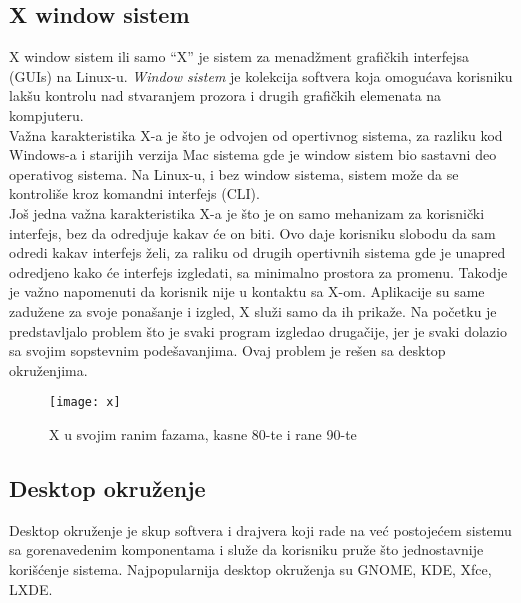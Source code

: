 \subsection{X window sistem}
X window sistem ili samo ``X'' je sistem za menadžment grafičkih interfejsa (GUIs) na Linux-u. \textit{Window sistem} je kolekcija softvera koja omogućava korisniku lakšu kontrolu nad stvaranjem prozora i drugih grafičkih elemenata na kompjuteru.\\
Važna karakteristika X-a je što je odvojen od opertivnog sistema, za razliku kod Windows-a i starijih verzija Mac sistema gde je window sistem bio sastavni deo operativog sistema. Na Linux-u, i bez window sistema, sistem može da se kontroliše kroz komandni interfejs (CLI).\\
Još jedna važna karakteristika X-a je što je on samo mehanizam za korisnički interfejs, bez da odredjuje kakav će on biti. Ovo daje korisniku slobodu da sam odredi kakav interfejs želi, za raliku od drugih opertivnih sistema gde je unapred odredjeno kako će interfejs izgledati, sa minimalno prostora za promenu. Takodje je važno napomenuti da korisnik nije u kontaktu sa X-om. Aplikacije su same zadužene za svoje ponašanje i izgled, X služi samo da ih prikaže. Na početku je predstavljalo problem što je svaki program izgledao drugačije, jer je svaki dolazio sa svojim sopstevnim podešavanjima. Ovaj problem je rešen sa desktop okruženjima.\\
\begin{figure}[H]
	\centering
	\texttt{[image: x]}
	\caption{X u svojim ranim fazama, kasne 80-te i rane 90-te}
\end{figure}
\subsection{Desktop okruženje}
Desktop okruženje je skup softvera i drajvera koji rade na već postojećem sistemu sa gorenavedenim komponentama i služe da korisniku pruže što jednostavnije korišćenje sistema. Najpopularnija desktop okruženja su GNOME, KDE, Xfce, LXDE.
\begin{figure}[h]
	\centering
    \qquad
\end{figure}
\begin{figure}[h]
	\centering
    \qquad
\end{figure}
